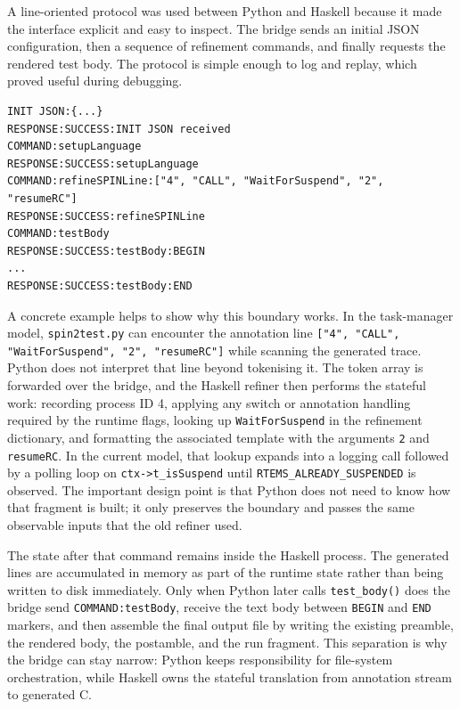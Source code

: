 A line-oriented protocol was used between Python and Haskell because
it made the interface explicit and easy to inspect. The bridge sends
an initial JSON configuration, then a sequence of refinement commands,
and finally requests the rendered test body. The protocol is simple
enough to log and replay, which proved useful during debugging.

\begin{lstlisting}[caption={Simplified bridge exchange between Python and Haskell}, label={lst:bridge-protocol}]
INIT JSON:{...}
RESPONSE:SUCCESS:INIT JSON received
COMMAND:setupLanguage
RESPONSE:SUCCESS:setupLanguage
COMMAND:refineSPINLine:["4", "CALL", "WaitForSuspend", "2", "resumeRC"]
RESPONSE:SUCCESS:refineSPINLine
COMMAND:testBody
RESPONSE:SUCCESS:testBody:BEGIN
...
RESPONSE:SUCCESS:testBody:END
\end{lstlisting}

A concrete example helps to show why this boundary works. In the
task-manager model, \texttt{spin2test.py} can encounter the annotation
line \texttt{["4", "CALL", "WaitForSuspend", "2", "resumeRC"]}
while scanning the generated trace. Python does not interpret that
line beyond tokenising it. The token array is forwarded over the
bridge, and the Haskell refiner then performs the stateful work:
recording process ID 4, applying any switch or annotation handling
required by the runtime flags, looking up \texttt{WaitForSuspend} in
the refinement dictionary, and formatting the associated template with
the arguments \texttt{2} and \texttt{resumeRC}. In the current model,
that lookup expands into a logging call followed by a polling loop on
\texttt{ctx->t\_isSuspend} until
\texttt{RTEMS\_ALREADY\_SUSPENDED} is observed. The important design
point is that Python does not need to know how that fragment is built;
it only preserves the boundary and passes the same observable inputs
that the old refiner used.

The state after that command remains inside the Haskell process. The
generated lines are accumulated in memory as part of the runtime state
rather than being written to disk immediately. Only when Python later
calls \texttt{test\_body()} does the bridge send
\texttt{COMMAND:testBody}, receive the text body between
\texttt{BEGIN} and \texttt{END} markers, and then assemble the final
output file by writing the existing preamble, the rendered body, the
postamble, and the run fragment. This separation is why the bridge can
stay narrow: Python keeps responsibility for file-system
orchestration, while Haskell owns the stateful translation from
annotation stream to generated C.

